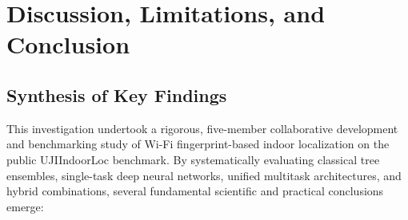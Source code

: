 
\section{Discussion, Limitations, and Conclusion}
\label{sec:discussion_conclusion}

\subsection{Synthesis of Key Findings}

This investigation undertook a rigorous, five-member collaborative development and benchmarking study of Wi-Fi fingerprint-based indoor localization on the public UJIIndoorLoc benchmark. By systematically evaluating classical tree ensembles, single-task deep neural networks, unified multitask architectures, and hybrid combinations, several fundamental scientific and practical conclusions emerge:

